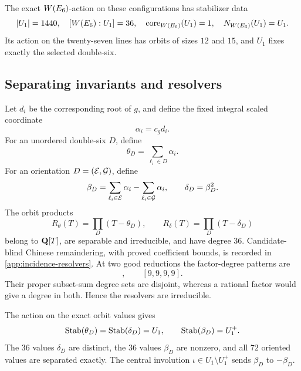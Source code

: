 The exact \(W(E_6)\)-action on these configurations has stabilizer data
\begin{equation}
 |U_1|=1440,\quad [W(E_6):U_1]=36,\quad
 \operatorname{core}_{W(E_6)}(U_1)=1,\quad N_{W(E_6)}(U_1)=U_1.
\label{eq:u1-exact-data}
\end{equation}
Its action on the twenty-seven lines has orbits of sizes \(12\) and \(15\),
and \(U_1\) fixes exactly the selected double-six.

\subsection{Separating invariants and resolvers}

Let \(d_i\) be the corresponding root of \(g\), and define the fixed integral
scaled coordinate
\begin{equation}
 \alpha_i=c_gd_i.
\label{eq:alpha-scaling}
\end{equation}
For an unordered double-six \(D\), define
\begin{equation}
 \theta_D=\sum_{\ell_i\in D}\alpha_i.
\label{eq:theta-def}
\end{equation}
For an orientation \(D=(\mathcal E,\mathcal G)\), define
\begin{equation}
 \beta_D=\sum_{\ell_i\in\mathcal E}\alpha_i-
          \sum_{\ell_i\in\mathcal G}\alpha_i,\qquad
 \delta_D=\beta_D^2.
\label{eq:beta-delta-def}
\end{equation}
The orbit products
\begin{equation}
 R_\theta(T)=\prod_D(T-\theta_D),\qquad
 R_\delta(T)=\prod_D(T-\delta_D)
\label{eq:resolvers}
\end{equation}
belong to \(\mathbf Q[T]\), are separable and irreducible, and have degree \(36\).
Candidate-blind Chinese remaindering, with proved coefficient bounds, is
recorded in \cref{app:incidence-resolvers}.  At two good reductions the
factor-degree patterns are
\begin{equation}
 [1,5,5,5,10,10],\qquad [9,9,9,9].
\label{eq:resolver-factor-patterns}
\end{equation}
Their proper subset-sum degree sets are disjoint, whereas a rational factor
would give a degree in both.  Hence the resolvers are irreducible.

The action on the exact orbit values gives
\begin{equation}
 \operatorname{Stab}(\theta_D)=\operatorname{Stab}(\delta_D)=U_1,\qquad
 \operatorname{Stab}(\beta_D)=U_1^+.
\label{eq:invariant-stabilizers}
\end{equation}
The \(36\) values \(\delta_D\) are distinct, the \(36\) values \(\beta_D\)
are nonzero, and all \(72\) oriented values are separated exactly.  The
central involution \(\iota\in U_1\setminus U_1^+\) sends \(\beta_D\) to
\(-\beta_D\).

